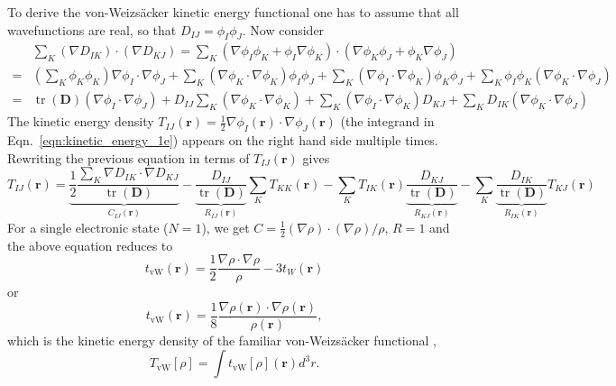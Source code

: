 \documentclass[journal=jpclcd,manuscript=letter]{achemso}
\DeclareMathOperator{\tr}{tr}
\newcommand\m[1]{\mathbf{#1}}
\renewcommand\vec[1]{\mathbf{#1}}
\begin{document}
To derive the von-Weizs\"{a}cker kinetic energy functional one has to assume that all wavefunctions are real, so that $D_{IJ} = \phi_I \phi_J$.
Now consider
\begin{equation}
\begin{split}
  & \sum_K (\nabla D_{IK}) \cdot (\nabla D_{KJ})
  = \sum_K (\nabla \phi_I \phi_K + \phi_I \nabla \phi_K)\cdot (\nabla \phi_K \phi_J + \phi_K \nabla \phi_J) \\
  =&
  (\sum_K \phi_K \phi_K) \nabla \phi_I \cdot \nabla \phi_J +
  \sum_K (\nabla \phi_K \cdot \nabla \phi_K) \phi_I \phi_J +
  \sum_K (\nabla \phi_I \cdot \nabla \phi_K) \phi_K \phi_J +
  \sum_K \phi_I \phi_K (\nabla \phi_K \cdot  \nabla \phi_J) \\
  =& \tr(\m{D}) (\nabla \phi_I \cdot \nabla \phi_J) + D_{IJ} \sum_{K} (\nabla \phi_K \cdot \nabla \phi_K) + \sum_K (\nabla \phi_I \cdot \nabla \phi_K) D_{KJ}
  + \sum_K D_{IK} (\nabla \phi_K \cdot \nabla \phi_J)
\end{split}
\end{equation}
The kinetic energy density $T_{IJ}(\vec{r}) = \frac{1}{2} \nabla \phi_I(\vec{r}) \cdot \nabla \phi_J(\vec{r})$ (the integrand in Eqn.~\ref{eqn:kinetic_energy_1e}) appears on the right hand side multiple times. Rewriting the previous equation in terms of $T_{IJ}(\vec{r})$ gives
\begin{equation}
T_{IJ}(\vec{r}) = \underbrace{\frac{1}{2} \frac{\sum_K \nabla D_{IK} \cdot \nabla D_{KJ}}{\tr(\m{D})}}_{C_{IJ}(\vec{r})} - \underbrace{\frac{D_{IJ}}{\tr(\m{D})}}_{R_{IJ}(\vec{r})} \sum_K T_{KK}(\vec{r}) - \sum_{K} T_{IK}(\vec{r}) \underbrace{\frac{D_{KJ}}{\tr(\m{D})}}_{R_{KJ}(\vec{r})} - \sum_{K} \underbrace{\frac{D_{IK}}{\tr(\m{D})}}_{R_{IK}(\vec{r})} T_{KJ}(\vec{r}) \label{eqn:kinetic_density_multistate}
\end{equation}
For a single electronic state ($N=1$), we get $C = \frac{1}{2} (\nabla \rho)\cdot (\nabla \rho) / \rho$, $R = 1$ and the above equation reduces to
\begin{equation}
t_{\text{vW}}(\vec{r}) = \frac{1}{2} \frac{\nabla \rho \cdot \nabla \rho}{\rho} - 3 t_W(\vec{r})
\end{equation}
or
\begin{equation}
t_{\text{vW}}(\vec{r}) = \frac{1}{8} \frac{\nabla \rho(\vec{r}) \cdot \nabla \rho(\vec{r})}{\rho(\vec{r})}, \label{eqn:von_Weizsaecker_ked}
\end{equation}
which is the kinetic energy density of the familiar von-Weizs\"{a}cker functional \cite{Weizsacker1935},
\begin{equation}
  T_{\text{vW}}[\rho] = \int t_{\text{vW}}[\rho](\vec{r}) d^3\!r  \label{eqn:von_Weizsaecker_functional}.
\end{equation}
\end{document}
